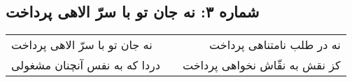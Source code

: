 \begin{center}
\section*{شماره ۳: نه جان تو با سرّ الاهی پرداخت}
\label{sec:003}
\begin{longtable}{l p{0.5cm} r}
نه جان تو با سرّ الاهی پرداخت
&&
نه در طلب نامتناهی پرداخت
\\
دردا که به نفس آنچنان مشغولی
&&
کز نقش به نقّاش نخواهی پرداخت
\\
\end{longtable}
\end{center}
